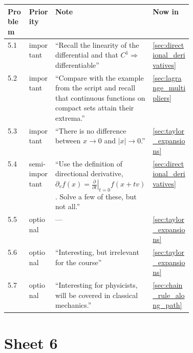 \begin{center}
\begin{tabular}{@{}l l p{0.42\linewidth} l@{}}
\textbf{Problem} & \textbf{Priority} & \textbf{Note} & \textbf{Now in} \\
\hline
5.1 & important & ``Recall the linearity of the differential and that $C^1 \Rightarrow$
  differentiable'' & \cref{sec:directional_derivatives} \\[3pt]
5.2 & important & ``Compare with the example from the script and recall that continuous
  functions on compact sets attain their extrema.'' & \cref{sec:lagrange_multipliers} \\[3pt]
5.3 & important & ``There is no difference between $x \to 0$ and $|x| \to 0$.'' &
  \cref{sec:taylor_expansions} \\[3pt]
5.4 & semi-important & ``Use the definition of directional derivative,
  $\partial_v f(x) = \left.\frac{\partial}{\partial t}\right|_{t=0} f(x+tv)$. Solve a few of
  these, but not all.'' & \cref{sec:directional_derivatives} \\[3pt]
5.5 & optional & --- & \cref{sec:taylor_expansions} \\[3pt]
5.6 & optional & ``Interesting, but irrelevant for the course'' & \cref{sec:taylor_expansions} \\[3pt]
5.7 & optional & ``Interesting for physicists, will be covered in classical mechanics.'' &
  \cref{sec:chain_rule_along_path} \\
\end{tabular}
\end{center}


\section{Sheet 6}
\label{sec:sheet_index_6}


